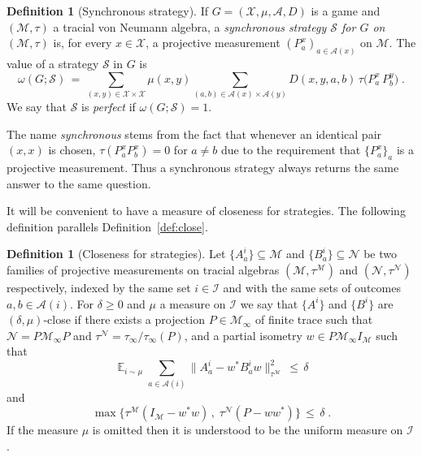 \documentclass[11pt]{article}
\theoremstyle{definition}
\newtheorem{definition}[theorem]{Definition}
\newcommand{\strategy}{\mathscr{S}}
\newcommand{\Id}{\ensuremath{I}}
\DeclareMathOperator*{\Expectation}{\mathbb{E}}
\newcommand{\Es}[1]{\Expectation_{#1}}
\newcommand{\mA}{\ensuremath{\mathcal{A}}}
\newcommand{\mM}{\ensuremath{\mathcal{M}}}
\newcommand{\mI}{\ensuremath{\mathcal{I}}}
\newcommand{\cM}{\ensuremath{\mathcal{M}}}
\newcommand{\mX}{\ensuremath{\mathcal{X}}}
\newcommand{\mN}{\mathcal{N}}
\begin{document}
\begin{definition}[Synchronous strategy]
If $G=(\mX,\mu,\mA,D)$ is a game and $(\mM,\tau)$ a tracial von Neumann algebra, a \emph{synchronous strategy $\strategy$ for $G$ on $(\mM,\tau)$} is, for every $x\in \mX$, a projective measurement $(P^x_a)_{a\in \mA(x)}$ on $\mM$. The value of a strategy $\strategy$ in $G$ is 
\[ \omega(G;\strategy)\,=\, \sum_{(x,y)\in\mX\times\mX}\mu(x,y)\sum_{(a,b)\in\mA(x)\times\mA(y)} D(x,y,a,b)\, \tau\big(P^x_a \,P^y_b\big) \;.%
\]
We say that $\strategy$ is \emph{perfect} if $\omega(G;\strategy)=1$.
\end{definition}
	
The name \emph{synchronous} stems from the fact that whenever an identical pair $(x,x)$ is chosen, $\tau(P^x_a P^x_b)=0$ for $a\neq b$ due to the requirement that $\{P^x_a\}_a$ is a projective measurement. Thus a synchronous strategy always returns the same answer to the same question. %

It will be convenient to have a measure of closeness for strategies. The following definition parallels Definition~\ref{def:close}. 

	\begin{definition}[Closeness for strategies]\label{def:close-meas}
Let $\{A^i_a\}\subseteq \mM$ and $\{B^i_a\}\subseteq \mN$ be two families of projective measurements on  tracial algebras $(\mM,\tau^\mM)$ and $(\mN,\tau^\mN)$ respectively, indexed by the same set $i\in \mI$ and with the same sets of outcomes $a,b\in\mA(i)$. For $\delta\geq0$ and $\mu$ a measure on $\mI$ we say that $\{A^i\}$ and $\{B^i\}$ are $(\delta,\mu)$-close if there exists a projection $P\in\mM_\infty$ of finite trace such that $\mN=P\mM_\infty P$ and $\tau^\mN=\tau_\infty/\tau_\infty(P)$, and a partial isometry $w\in P \mM_\infty \Id_\mM$ such that 
\[ \Es{i\sim\mu} \sum_{a\in\mA(i)} \big\| A^i_a - w^* B^i_a w \big\|_{\tau^\cM}^2 \,\leq\,\delta\]
and 
\[\max\big\{ \tau^\mM(\Id_\mM-w^*w)\,,\; \tau^\mN(P-ww^*)\big\} \,\leq\, \delta\;.\]
If the measure $\mu$ is omitted then it is understood to be the uniform measure on $\mI$.
\end{definition}
\end{document}
